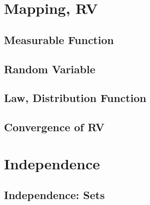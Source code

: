 \documentclass[a4paper,12pt,twoside]{book}
\begin{document}
\chapter{Mapping, RV}

\section{Measurable Function}

\section{Random Variable}

\section{Law, Distribution Function}

\section{Convergence of RV}

\chapter{Independence}

\section{Independence: Sets}

\end{document}
